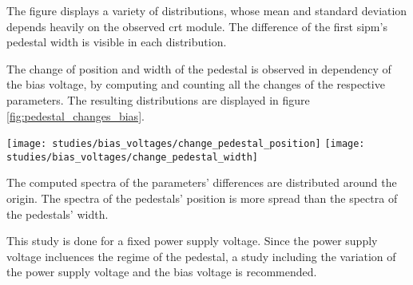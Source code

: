 The figure displays a variety of distributions, whose mean and standard deviation depends heavily on the observed \gls{crt} module.
The difference of the first \gls{sipm}'s pedestal width is visible in each distribution.

The change of position and width of the pedestal is observed in dependency of the bias voltage, by computing and counting all the changes of the respective parameters.
The resulting distributions are displayed in figure \ref{fig:pedestal_changes_bias}.

\begin{figure*}
  \centering
  \texttt{[image: studies/bias\_voltages/change\_pedestal\_position]}
  \texttt{[image: studies/bias\_voltages/change\_pedestal\_width]}
  \caption{%
    Histograms displaying the spectrum of changes in pedestal position, width and amplitude for observation set OS2.
  }
  \label{fig:pedestal_changes_bias}
\end{figure*}

The computed spectra of the parameters' differences are distributed around the origin.
The spectra of the pedestals' position is more spread than the spectra of the pedestals' width.

This study is done for a fixed power supply voltage.
Since the power supply voltage incluences the regime of the pedestal, a study including the variation of the power supply voltage and the bias voltage is recommended.
